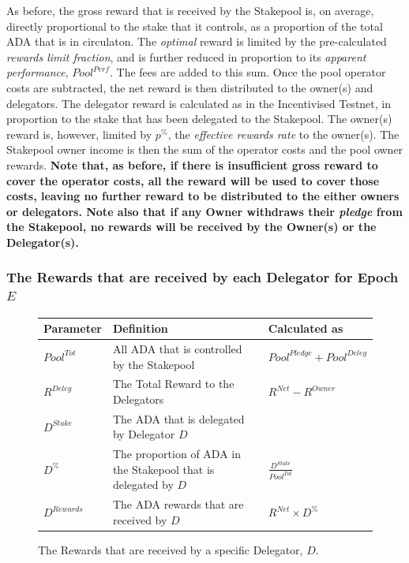 \documentclass[11pt,a4paper,dvipsnames,twosided,final]{article}
\newcommand{\ada}{ADA{}}
\begin{document}
\noindent
As before, the gross reward that is received by the Stakepool is, on average, directly proportional to the
stake that it controls, as a proportion of the total \ada{} that is in circulaton.
The \emph{optimal} reward is limited by the pre-calculated \emph{rewards limit fraction}, and is further reduced in
proportion to its \emph{apparent performance}, $\textit{Pool}^{\textit{Perf}}$.
The fees are added to this sum.
Once the pool operator costs are subtracted,
the net reward is then distributed to the owner(s) and delegators.
The delegator reward is calculated as in the Incentivised Testnet, in proportion to the stake that has
been delegated to the Stakepool.
The owner(s) reward is, however, limited by $p^\%$, the \emph{effective rewards rate} to the owner(s).
%
The Stakepool owner income is then the sum of the operator costs and the pool owner rewards.
\textbf{Note that, as before, if there is insufficient gross reward to cover the operator costs, all the reward will be used to cover those
costs, leaving no further reward to be distributed to the either owners or delegators.
Note also that if any Owner withdraws their \emph{pledge} from the Stakepool, no rewards will be received by the Owner(s) or the Delegator(s).}

\subsubsection*{The Rewards that are received by each Delegator for Epoch $E$}

\begin{figure}[h!]
\begin{center}
\begin{tabular}{||l|p{9cm}|l||}
  \hline \hline
\textbf{Parameter} & \textbf{Definition} & \textbf{Calculated as} \\\hline
${\textit{Pool}}^{Tot}$ & All \ada{} that is controlled by the Stakepool & ${\textit{Pool}}^\textit{Pledge} + {\textit{Pool}}^\textit{Deleg}$ \\\hline
$R^{Deleg}$ & The Total Reward to the Delegators & $R^{\textit{Net}} - R^\textit{Owner}$ \\\hline
$D^{Stake}$ & The \ada{} that is delegated by Delegator $D$ & \\\hline
$D^\%$ & The proportion of \ada{} in the Stakepool that is delegated by $D$ & $\frac{D^{Stake}}{Pool^{Tot}}$ \\\hline
$D^{Rewards}$ & The \ada{} rewards that are received by $D$ & $R^{\textit{Net}} \times D^\%$ \\\hline
\hline
\end{tabular}
\end{center}
\caption{The Rewards that are received by a specific Delegator, $D$.}
\end{figure}
\end{document}
